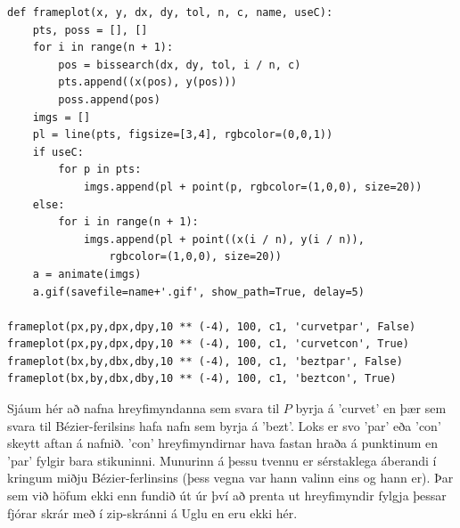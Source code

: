 \documentclass{article}
\begin{document}
\begin{verbatim}
def frameplot(x, y, dx, dy, tol, n, c, name, useC):
    pts, poss = [], []
    for i in range(n + 1):
        pos = bissearch(dx, dy, tol, i / n, c)
        pts.append((x(pos), y(pos)))
        poss.append(pos)
    imgs = []
    pl = line(pts, figsize=[3,4], rgbcolor=(0,0,1))
    if useC:
        for p in pts:
            imgs.append(pl + point(p, rgbcolor=(1,0,0), size=20))
    else:
        for i in range(n + 1):
            imgs.append(pl + point((x(i / n), y(i / n)), 
                rgbcolor=(1,0,0), size=20))
    a = animate(imgs)
    a.gif(savefile=name+'.gif', show_path=True, delay=5)

frameplot(px,py,dpx,dpy,10 ** (-4), 100, c1, 'curvetpar', False)
frameplot(px,py,dpx,dpy,10 ** (-4), 100, c1, 'curvetcon', True)
frameplot(bx,by,dbx,dby,10 ** (-4), 100, c1, 'beztpar', False)
frameplot(bx,by,dbx,dby,10 ** (-4), 100, c1, 'beztcon', True)
\end{verbatim}

\vspace*{0.5cm}

Sjáum hér að nafna hreyfimyndanna sem svara til $P$ byrja á 'curvet' en þær sem svara til Bézier-ferilsins hafa nafn sem byrja á 'bezt'. Loks er svo 'par' eða 'con' skeytt aftan á nafnið. 'con' hreyfimyndirnar hava fastan hraða á punktinum en 'par' fylgir bara stikuninni. Munurinn á þessu tvennu er sérstaklega áberandi í kringum miðju Bézier-ferlinsins (þess vegna var hann valinn eins og hann er). Þar sem við höfum ekki enn fundið út úr því að prenta ut hreyfimyndir fylgja þessar fjórar skrár með í zip-skránni á Uglu en eru ekki hér.
\end{document}
